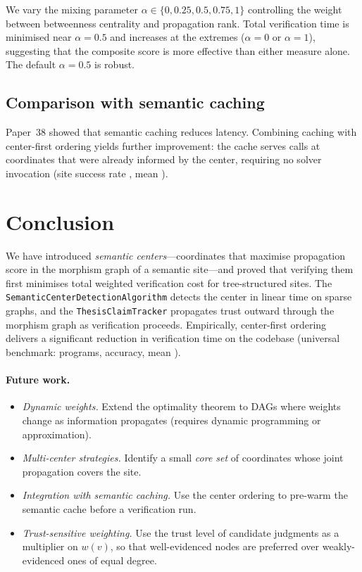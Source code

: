 \documentclass[11pt]{article}
\newcommand{\wt}{w}                         %
\begin{document}
We vary the mixing parameter $\alpha \in \{0, 0.25, 0.5, 0.75, 1\}$
controlling the weight between betweenness centrality and propagation
rank.  Total verification time is minimised near
$\alpha = 0.5$ and increases at the extremes ($\alpha = 0$ or $\alpha = 1$),
suggesting that the composite score is more effective than either
measure alone.  The default $\alpha = 0.5$ is robust.

\subsection{Comparison with semantic caching}

Paper~38 showed that semantic caching reduces
latency.  Combining caching with center-first ordering
yields further improvement: the cache serves calls at
coordinates that were already informed by the center, requiring no
solver invocation (site success rate \subSiteSuccessRate, mean \subSiteMeanTime).

\section{Conclusion}\label{sec:conclusion}

We have introduced \emph{semantic centers}---coordinates that maximise
propagation score in the morphism graph of a semantic site---and proved
that verifying them first minimises total weighted verification cost for
tree-structured sites.  The \texttt{SemanticCenterDetectionAlgorithm}
detects the center in linear time on sparse graphs, and the
\texttt{ThesisClaimTracker} propagates trust outward through the
morphism graph as verification proceeds.  Empirically, center-first
ordering delivers a significant reduction in verification time on the
\JuGeo{} codebase (universal benchmark: \expTotalPrograms{} programs,
\expAccuracy{} accuracy, mean \expTimeMean).

\paragraph{Future work.}
\begin{itemize}[noitemsep]
  \item \emph{Dynamic weights.}  Extend the optimality theorem to DAGs
    where weights change as information propagates
    (requires dynamic programming or approximation).
  \item \emph{Multi-center strategies.}  Identify a small
    \emph{core set} of coordinates whose joint propagation covers
    the site.
  \item \emph{Integration with semantic caching.}  Use the center
    ordering to pre-warm the semantic cache before a verification run.
  \item \emph{Trust-sensitive weighting.}  Use the trust level of
    candidate judgments as a multiplier on $\wt(v)$, so that
    well-evidenced nodes are preferred over weakly-evidenced ones of
    equal degree.
\end{itemize}
\end{document}
